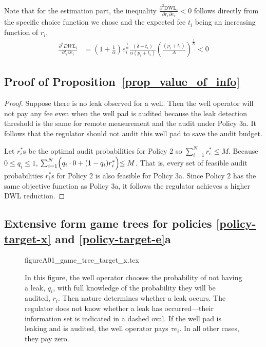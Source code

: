 Note that for the estimation part, the inequality \(\frac{\partial^2 \text{DWL}_i}{\partial r_i \partial e_i} < 0\) follows directly from the specific choice function we chose and the expected fee \(t_i\) being an increasing function of \(r_i\),
\begin{align*}
  \frac{\partial^2 DWL_i}{\partial t_i \partial e_i} &=
    \left(1 + \frac{1}{\alpha}\right) e^{\frac{1}{\alpha}}_i
    \frac{(\delta - t_i)}{\alpha (p_i + t_i)}
    \left(\frac{(p_i + t_i)}{A}\right)^{\frac{1}{\alpha}} < 0
\end{align*}

\subsection{Proof of Proposition~\ref{prop_value_of_info}}
\begin{proof}
Suppose there is no leak observed for a well.
Then the well operator will not pay any fee even when the well pad is audited because the leak detection threshold is the same for remote measurement and the audit under Policy 3a.
It follows that the regulator should not audit this well pad to save the audit budget.

Let \(r^*_i\)s be the optimal audit probabilities for Policy 2 so \(\sum^{N}_{i=1} r^*_i \leq M\).
Because \(0 \leq q_i \leq 1\), \(\sum^{N}_{i=1} \Bigl( q_i \cdot 0 + (1 - q_i) r^*_i \Bigl) \leq M\).
That is, every set of feasible audit probabilities \(r^*_i\)s for Policy 2 is also feasible for Policy 3a.
Since Policy 2 has the same objective function as Policy 3a, it follows the regulator achieves a higher \gls{DWL} reduction.
\end{proof}


\newpage

\subsection{Extensive form game trees for policies \ref{policy-target-x} and \ref{policy-target-e}a}



\begin{figure}[!pbth]
\vspace*{-1\baselineskip}%
{figureA01_game_tree_target_x.tex} %

\begin{minipage}{1\textwidth}

\begin{justify}
{\small
In this figure, the well operator chooses the probability of not having a leak, \(q_i\), with full knowledge of the probability they will be audited, \(r_i\).
Then nature determines whether a leak occurs.
The regulator does not know whether a leak has occurred---their information set is indicated in a dashed oval.
If the well pad is leaking and is audited, the well operator pays \(\tau e_i\).
In all other cases, they pay zero.
}
\end{justify}
\end{minipage}
\end{figure}



